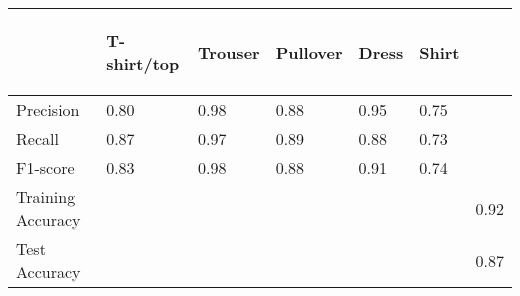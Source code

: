 \vspace{2em}
\begin{tabular}{lllllll}
 &  \hspace{0.2em}\begin{rotate}{45} T-shirt/top \end{rotate}  &  \hspace{0.2em}\begin{rotate}{45} Trouser \end{rotate}  &  \hspace{0.2em}\begin{rotate}{45} Pullover \end{rotate}  &  \hspace{0.2em}\begin{rotate}{45} Dress \end{rotate}  &  \hspace{0.2em}\begin{rotate}{45} Shirt \end{rotate} \\
 \toprule
 Precision                       &                  0.80                  &                   0.98                    &                   0.88                   &                   0.95                   &                   0.75\\
 Recall                          &                  0.87                  &                   0.97                    &                   0.89                   &                   0.88                   &                   0.73\\
F1-score &                  0.83                 &                   0.98                    &                   0.88                   &                   0.91                   &                   0.74\\
 \midrule
Training Accuracy & & & & & & 0.92\\
Test Accuracy & & & & & & 0.87\\

 \bottomrule
\end{tabular}
